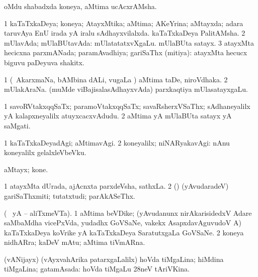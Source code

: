 \bentry
{} 
\gl{\nA}
\expl{}
\bmng
oMdu shabadxda koneya, aMtima ucAcxrAMsha. 
\emng
\eentry

\bentry
{} 
\gl{\gu}
\expl{}
\bmng
\bnum
\num{1} kaTaTxkaDeya; koneya; AtayxMtika; aMtima; AKeYrina; aMtayxda; adara taruvAya EnU irada yA iralu sAdhayxvilalxda.  kaTaTxkaDeya PalitAMsha. 
\num{2} mUlavAda; mUlaBUtavAda:  mUlatatatxvXgaLu.  mUlaBUta satayx. 
\num{3} atayxMta hecicxna parxmANada; paramAvadhiya; gariSaThx (mitiya):  atayxMta hecucx biguvu paDeyuva shakitx. 
\enum
\emng

\noindent
\gl{\pagu}
\expl{}
\bmng
\bnum
\num{1}  (\kanmu\ AkarxmaNa, bAMbina dALi, \mo vugaLa \vi) aMtima taDe, niroVdhaka. 
\num{2}  mUlakAraNa.  (muMde viBajisalasAdhayxvAda) parxkaqtiya mUlasatayxgaLu. 
\enum
\emng
\eentry

\bentry
{} 
\gl{\nA}
\expl{}
\bmng
\bnum
\num{1} savoRVtakxqqSaTx; paramoVtakxqqSaTx; savaRsherxVSaThx; sAdhaneyalilx yA kalapxneyalilx atuyxcacxvAdudu. 
\num{2} aMtima yA mUlaBUta satayx yA saMgati. 
\enum
\emng
\eentry

\bentry
{} 
\gl{\kirxvi}
\expl{}
\bmng
\bnum
\num{1} kaTaTxkaDeyadAgi; aMtimavAgi. 
\num{2} koneyalilx; niNARyakavAgi:  nAnu koneyalilx gelalxleVbeVku. 
\enum
\emng
\eentry

\bentry
{} 
\gl{\nA}
\expl{}
\bmng
aMtayx; kone. 
\emng
\eentry

\bentry
{}
\gl{\nA}
\expl{\Latin}
\bmng
\bnum
\num{1} atayxMta dUrada, ajAcnxta parxdeVsha, sathxLa. 
\num{2} (\rUpa) (yAvudaradeV) gariSaThxmiti; tutatxtudi; parAkASeThx. 
\enum
\emng
\eentry

\bentry
{} 
\gl{\nA}
\expl{}
(\bava\  yA  \ucAcx-- aliTxmeVTa).\bmng
\bnum
\num{1} aMtima beVDike; (yAvudanunx nirAkarisidedxV Adare saMbaMdha vicePxVda, yudadhx GoVSaNe, \mo vakekx AsapxdavAguvudoV A) kaTaTxkaDeya koVrike yA kaTaTxkaDeya SaratutxgaLa GoVSaNe. 
\num{2} koneya nidhARra; kaDeV mAtu; aMtima tiVmARna. 
\enum
\emng
\eentry

\bentry
{} 
\gl{\gu}
\expl{}
\bmng
(vANijayx) (vAyxvahArika patarxgaLalilx) hoVda tiMgaLina; hiMdina tiMgaLina; gatamAsada:  hoVda tiMgaLu 28neV tAriVKina. 
\emng
\eentry

